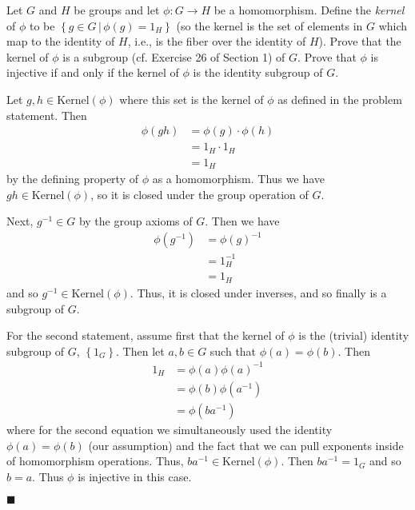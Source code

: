\documentclass[12pt]{article}
\renewcommand{\qed}{\hfill$\blacksquare$}
\renewenvironment{proof}{\begin{addmargin}[1em]{0em}\begin{newproof}}{\end{newproof}\end{addmargin}\qed}
\newenvironment{problem}[2][Exercise]{\begin{trivlist}
\item[\hskip \labelsep {\bfseries #1}\hskip \labelsep {\bfseries #2.}]}{\end{trivlist}}
\begin{document}
\begin{problem}{1.6.14}
Let $G$ and $H$ be groups and let $\phi:G\rightarrow H$ be a homomorphism. Define the \textit{kernel} of $\phi$ to be $\left\{g\in G \, | \, \phi\left(g\right)=1_H\right\}$ (so the kernel is the set of elements in $G$ which map to the identity of $H$, i.e., is the fiber over the identity of $H$). Prove that the kernel of $\phi$ is a subgroup (cf. Exercise 26 of Section 1) of $G$. Prove that $\phi$ is injective if and only if the kernel of $\phi$ is the identity subgroup of $G$.
\end{problem}
\begin{proof}
Let $g,h \in \text{Kernel}\left(\phi\right)$ where this set is the kernel of $\phi$ as defined in the problem statement. Then
\begin{equation*}
    \begin{split}
        \phi\left(gh\right) & = \phi\left(g\right)\cdot \phi\left(h\right) \\
        & = 1_H \cdot 1_H \\
        & = 1_H
    \end{split}
\end{equation*}
by the defining property of $\phi$ as a homomorphism. Thus we have $gh \in \text{Kernel}\left(\phi\right)$, so it is closed under the group operation of $G$.

Next, $g^{-1}\in G$ by the group axioms of $G$. Then we have
\begin{equation*}
    \begin{split}
        \phi\left(g^{-1}\right) & = \phi\left(g\right)^{-1} \\
        & = 1_H^{-1} \\
        & = 1_H
    \end{split}
\end{equation*}
and so $g^{-1}\in \text{Kernel}\left(\phi\right)$. Thus, it is closed under inverses, and so finally is a subgroup of $G$.

For the second statement, assume first that the kernel of $\phi$ is the (trivial) identity subgroup of $G$, $\left\{1_G\right\}$. Then let $a,b\in G$ such that $\phi\left(a\right)=\phi\left(b\right)$. Then
\begin{equation*}
    \begin{split}
        1_H & = \phi\left(a\right)\phi\left(a\right)^{-1} \\
        & = \phi\left(b\right)\phi\left(a^{-1}\right) \\
        & = \phi\left(ba^{-1}\right)
    \end{split}
\end{equation*}
where for the second equation we simultaneously used the identity $\phi\left(a\right)=\phi\left(b\right)$ (our assumption) and the fact that we can pull exponents inside of homomorphism operations. Thus, $ba^{-1}\in \text{Kernel}\left(\phi\right)$. Then $ba^{-1} = 1_G$ and so $b=a$. Thus $\phi$ is injective in this case.


\end{proof}
\end{document}
